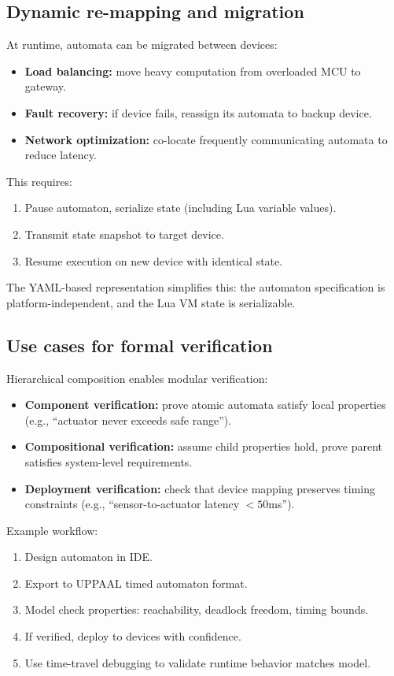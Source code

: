 \subsection{Dynamic re-mapping and migration}

At runtime, automata can be migrated between devices:
\begin{itemize}
  \item \textbf{Load balancing:} move heavy computation from overloaded MCU to gateway.
  \item \textbf{Fault recovery:} if device fails, reassign its automata to backup device.
  \item \textbf{Network optimization:} co-locate frequently communicating automata to reduce latency.
\end{itemize}

This requires:
\begin{enumerate}
  \item Pause automaton, serialize state (including Lua variable values).
  \item Transmit state snapshot to target device.
  \item Resume execution on new device with identical state.
\end{enumerate}

The YAML-based representation simplifies this: the automaton specification is platform-independent, and the Lua VM state is serializable.

\subsection{Use cases for formal verification}

Hierarchical composition enables modular verification:
\begin{itemize}
  \item \textbf{Component verification:} prove atomic automata satisfy local properties (e.g., ``actuator never exceeds safe range'').
  \item \textbf{Compositional verification:} assume child properties hold, prove parent satisfies system-level requirements.
  \item \textbf{Deployment verification:} check that device mapping preserves timing constraints (e.g., ``sensor-to-actuator latency $< 50$ms'').
\end{itemize}

Example workflow:
\begin{enumerate}
  \item Design automaton in IDE.
  \item Export to UPPAAL timed automaton format.
  \item Model check properties: reachability, deadlock freedom, timing bounds.
  \item If verified, deploy to devices with confidence.
  \item Use time-travel debugging to validate runtime behavior matches model.
\end{enumerate}

